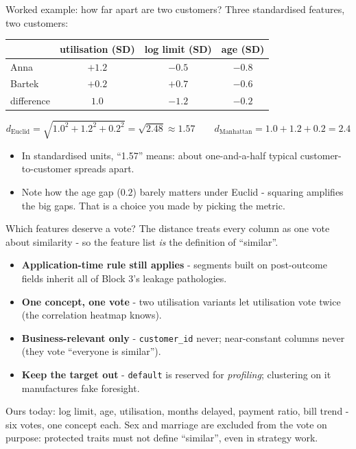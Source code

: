 \documentclass[10pt,aspectratio=169]{beamer}
\begin{document}
\begin{frame}{Worked example: how far apart are two customers?}
  Three standardised features, two customers:
  \begin{center}\small
  \begin{tabular}{@{}lccc@{}}
    \toprule
     & utilisation (SD) & log limit (SD) & age (SD) \\
    \midrule
    Anna & $+1.2$ & $-0.5$ & $-0.8$ \\
    Bartek & $+0.2$ & $+0.7$ & $-0.6$ \\
    \midrule
    difference & $1.0$ & $-1.2$ & $-0.2$ \\
    \bottomrule
  \end{tabular}
  \end{center}
  \[
    d_{\text{Euclid}} = \sqrt{1.0^2 + 1.2^2 + 0.2^2} = \sqrt{2.48} \approx 1.57
    \qquad
    d_{\text{Manhattan}} = 1.0 + 1.2 + 0.2 = 2.4
  \]
  \begin{itemize}\small
    \item In standardised units, ``1.57'' means: about one-and-a-half
          typical customer-to-customer spreads apart.
    \item Note how the age gap ($0.2$) barely matters under Euclid -
          squaring amplifies the big gaps. That is a \alert{choice} you
          made by picking the metric.
  \end{itemize}
\end{frame}

\begin{frame}{Which features deserve a vote?}
  The distance treats every column as one vote about similarity -
  so the feature list \emph{is} the definition of ``similar''.
  \begin{itemize}
    \item \textbf{Application-time rule still applies} - segments built on
          post-outcome fields inherit all of Block 3's leakage pathologies.
    \item \textbf{One concept, one vote} - two utilisation variants let
          utilisation vote twice (the correlation heatmap knows).
    \item \textbf{Business-relevant only} - \texttt{customer\_id} never;
          near-constant columns never (they vote ``everyone is similar'').
    \item \textbf{Keep the target out} - \texttt{default} is reserved for
          \emph{profiling}; clustering on it manufactures fake foresight.
  \end{itemize}
  \vspace{0.4em}
  \begin{center}\small
    Ours today: log limit, age, utilisation, months delayed, payment
    ratio, bill trend - six votes, one concept each. \alert{Sex and
    marriage are excluded from the vote on purpose}: protected traits must
    not define ``similar'', even in strategy work.
  \end{center}
\end{frame}
\end{document}
